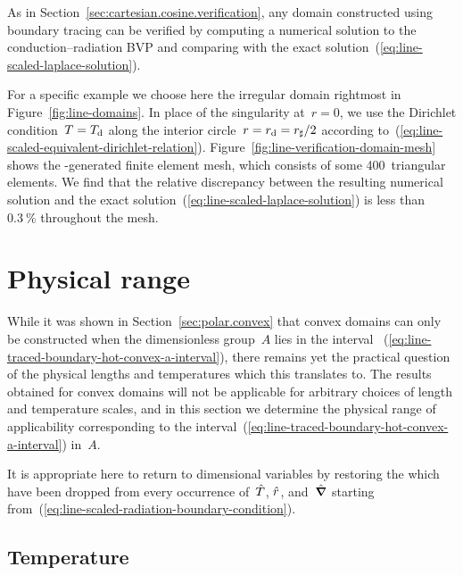 As in Section~\ref{sec:cartesian.cosine.verification},
any domain constructed using boundary tracing can be verified
by computing a numerical solution to the conduction--radiation BVP
and comparing with the exact solution~(\ref{eq:line-scaled-laplace-solution}).

For a specific example we choose here
the irregular domain rightmost in Figure~\ref{fig:line-domains}.
In place of the singularity at~$r = 0$,
we use the Dirichlet condition~$T = T_{\mathrm{d}}$
along the interior circle~$r = r_{\mathrm{d}} = r_\sharp / 2$
according to~(\ref{eq:line-scaled-equivalent-dirichlet-relation}).
Figure~\ref{fig:line-verification-domain-mesh}
shows the -generated finite element mesh,
which consists of some 400~triangular elements.
We find that the relative discrepancy
between the resulting numerical solution
and the exact solution~(\ref{eq:line-scaled-laplace-solution})
is less than~$\SI{0.3}{\percent}$ throughout the mesh.

\begin{figure}
\end{figure}

\section{Physical range}
\label{sec:polar.physical}

While it was shown in Section~\ref{sec:polar.convex} that
convex domains can only be constructed
when the dimensionless group~$A$ lies in the interval~%
  (\ref{eq:line-traced-boundary-hot-convex-a-interval}),
there remains yet the practical question of
the physical lengths and temperatures which this translates to.
The results obtained for convex domains
will not be applicable for arbitrary choices
of length and temperature scales,
and in this section we determine the physical range of applicability
corresponding to
the interval~(\ref{eq:line-traced-boundary-hot-convex-a-interval}) in~$A$.

It is appropriate here to return to dimensional variables
by restoring the \scalingmarks{} which have been dropped
from every occurrence of~$\hat{T}$, $\hat{r}$, and~$\mathop{}\!\hat{\mathop{}\!\boldsymbol{\mathbf{\nabla}}}$
starting from~(\ref{eq:line-scaled-radiation-boundary-condition}).

\subsection{Temperature}
\label{sec:polar.physical.temperature}

